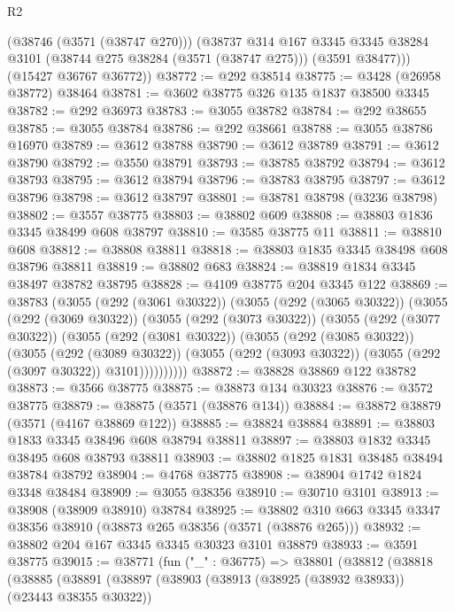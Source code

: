\begin{lexlean}{R2}
\begin{coremodule}
        (@38746 (@3571 (@38747 @270)))
        (@38737
          @314
          @167
          @3345
          @3345
          @38284
          @3101
          (@38744 @275 @38284 (@3571 (@38747 @275)))
          (@3591 @38477)))
      (@15427 @36767 @36772))
@38772 := @292 @38514
@38775 := @3428 (@26958 @38772) @38464
@38781 := @3602 @38775 @326 @135 @1837 @38500 @3345
@38782 := @292 @36973
@38783 := @3055 @38782
@38784 := @292 @38655
@38785 := @3055 @38784
@38786 := @292 @38661
@38788 := @3055 @38786 @16970
@38789 := @3612 @38788
@38790 := @3612 @38789
@38791 := @3612 @38790
@38792 := @3550 @38791
@38793 := @38785 @38792
@38794 := @3612 @38793
@38795 := @3612 @38794
@38796 := @38783 @38795
@38797 := @3612 @38796
@38798 := @3612 @38797
@38801 := @38781 @38798 (@3236 @38798)
@38802 := @3557 @38775
@38803 := @38802 @609
@38808 := @38803 @1836 @3345 @38499 @608 @38797
@38810 := @3585 @38775 @11
@38811 := @38810 @608
@38812 := @38808 @38811
@38818 := @38803 @1835 @3345 @38498 @608 @38796 @38811
@38819 := @38802 @683
@38824 := @38819 @1834 @3345 @38497 @38782 @38795
@38828 := @4109 @38775 @204 @3345 @122
@38869 := @38783
    (@3055
      (@292 (@3061 @30322))
      (@3055
        (@292 (@3065 @30322))
        (@3055
          (@292 (@3069 @30322))
          (@3055
            (@292 (@3073 @30322))
            (@3055
              (@292 (@3077 @30322))
              (@3055
                (@292 (@3081 @30322))
                (@3055
                  (@292 (@3085 @30322))
                  (@3055
                    (@292 (@3089 @30322))
                    (@3055 (@292 (@3093 @30322)) (@3055 (@292 (@3097 @30322)) @3101))))))))))
@38872 := @38828 @38869 @122 @38782
@38873 := @3566 @38775
@38875 := @38873 @134 @30323
@38876 := @3572 @38775
@38879 := @38875 (@3571 (@38876 @134))
@38884 := @38872 @38879 (@3571 (@4167 @38869 @122))
@38885 := @38824 @38884
@38891 := @38803 @1833 @3345 @38496 @608 @38794 @38811
@38897 := @38803 @1832 @3345 @38495 @608 @38793 @38811
@38903 := @38802 @1825 @1831 @38485 @38494 @38784 @38792
@38904 := @4768 @38775
@38908 := @38904 @1742 @1824 @3348 @38484
@38909 := @3055 @38356
@38910 := @30710 @3101
@38913 := @38908 (@38909 @38910) @38784
@38925 := @38802 @310 @663 @3345 @3347 @38356 @38910 (@38873 @265 @38356 (@3571 (@38876 @265)))
@38932 := @38802 @204 @167 @3345 @3345 @30323 @3101 @38879
@38933 := @3591 @38775
@39015 := @38771
    (fun ("_" : @36775) =>
    @38801
      (@38812
        (@38818
          (@38885
            (@38891
              (@38897
                (@38903
                  (@38913 (@38925 (@38932 @38933)) (@23443 @38355 @30322))

\end{coremodule}
\end{lexlean}
